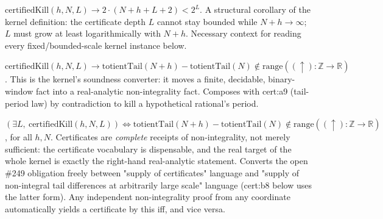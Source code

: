 \begin{lem}
$\mathrm{certifiedKill}(h,N,L) \to 2\cdot(N+h+L+2) < 2^L$. A structural corollary of the kernel definition: the certificate depth $L$ cannot stay bounded while $N+h \to \infty$; $L$ must grow at least logarithmically with $N+h$. Necessary context for reading every fixed/bounded-scale kernel instance below.
\par\noindent{}   
\end{lem}

\begin{prop}
$\mathrm{certifiedKill}(h,N,L) \to \mathrm{totientTail}(N+h) - \mathrm{totientTail}(N) \notin \mathrm{range}((\uparrow):\mathbb{Z}\to\mathbb{R})$. This is the kernel's soundness converter: it moves a finite, decidable, binary-window fact into a real-analytic non-integrality fact. Composes with cert:a9 (tail-period law) by contradiction to kill a hypothetical rational's period.
\par\noindent{}   
\end{prop}

\begin{thm}
$(\exists L,\ \mathrm{certifiedKill}(h,N,L)) \iff \mathrm{totientTail}(N+h) - \mathrm{totientTail}(N) \notin \mathrm{range}((\uparrow):\mathbb{Z}\to\mathbb{R})$, for all $h,N$. Certificates are \emph{complete} receipts of non-integrality, not merely sufficient: the certificate vocabulary is dispensable, and the real target of the whole kernel is exactly the right-hand real-analytic statement. Converts the open \#249 obligation freely between "supply of certificates" language and "supply of non-integral tail differences at arbitrarily large scale" language (cert:b8 below uses the latter form). Any independent non-integrality proof from any coordinate automatically yields a certificate by this iff, and vice versa.
\par\noindent{}   
\end{thm}

